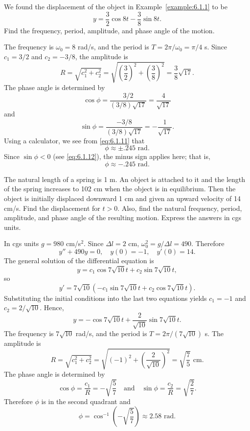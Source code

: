 \documentclass{ximera}
\begin{document}
\begin{example}\label{example:6.1.2}
We found the displacement of the object
 in Example~\ref{example:6.1.1} to be
$$
y=\frac{3}{2}\cos8t-\frac{3}{8}\sin8t.
$$
Find the frequency, period, amplitude, and phase angle of the motion.

\begin{explanation}
The frequency is $\omega_0=8$ rad/s, and the period is
$T=2\pi/\omega_0=\pi/4$ s. Since $c_1=3/2$ and $c_2=-3/8$,
the amplitude is
$$
R=\sqrt{c^2_1+c^2_2}=\sqrt{\left(\frac{3}{2}\right)^2+\left(\frac{3}{8}\right)^2}
=\frac{3}{8}\sqrt{17}.
$$
The phase angle is determined by
\begin{equation}\label{eq:6.1.11}
\cos\phi=\frac{3/2}{(3/8)\sqrt{17}}=\frac{4}{\sqrt{17}}
\end{equation}
and
\begin{equation}\label{eq:6.1.12}
\sin\phi=\frac{-3/8}{(3/8)\sqrt{17}}=-\frac{1}{\sqrt{17}}.
\end{equation}
 Using a calculator, we see from \eqref{eq:6.1.11} that
$$
\phi\approx\pm.245\mbox{ rad}.
$$
Since $\sin\phi<0$ (see \eqref{eq:6.1.12}), the minus sign applies here;
that is,
$$
\phi\approx-.245\mbox{ rad}.
$$
\end{explanation}
\end{example}


\begin{example}\label{example:6.1.3}
The natural length of a spring is 1 m. An object is attached to it and
the length of the spring increases to 102 cm when the object is in
equilibrium. Then the object is initially displaced downward 1 cm and
given an upward velocity of 14 cm/s. Find the displacement for
$t>0$. Also, find the natural frequency, period, amplitude, and phase
angle of the resulting motion. Express the answers in cgs units.

\begin{explanation}
In cgs units $g=980$ cm/s$^2$. Since $\Delta l=2$ cm,
$\omega_0^2=g/\Delta l=490$.
Therefore
$$
y''+490y=0, \quad  y(0)=-1,\quad y'(0)=14.
$$
 The general solution of the differential equation is
$$
y=c_1\cos7\sqrt{10}t+c_2\sin7\sqrt{10}t,
$$
so
$$
y'=7\sqrt{10}\left(-c_1\sin7\sqrt{10}t+c_2\cos7\sqrt{10}t\right).
$$
Substituting the initial conditions into the last two equations yields
$c_1=-1$ and $c_2=2/\sqrt{10}$. Hence,
$$
y=-\cos7\sqrt{10}t+\frac{2}{\sqrt{10}}\sin7\sqrt{10}t.
$$
The frequency is $7\sqrt{10}$ rad/s, and  the period
is $T=2\pi/(7\sqrt{10})$  s.
The amplitude  is
$$
R=\sqrt{c_1^2+c_2^2}=\sqrt{(-1)^2+\left(\frac{2}{\sqrt{10}}\right)^2}=
\sqrt{\frac{7}{5}}\mbox{ cm}.
$$
The  phase angle  is determined by
$$
\cos\phi=\frac{c_1}{R}=-\sqrt{\frac{5}{7}}\quad\mbox{and}\quad\sin\phi=
\frac{c_2}{R}=\sqrt{\frac{2}{7}}.
$$
Therefore $\phi$ is in the second quadrant and
$$
\phi=\cos^{-1}\left(-\sqrt{\frac{5}{7}}\right)\approx2.58\mbox{ rad}.
$$
\end{explanation}
\end{example}
\end{document}
